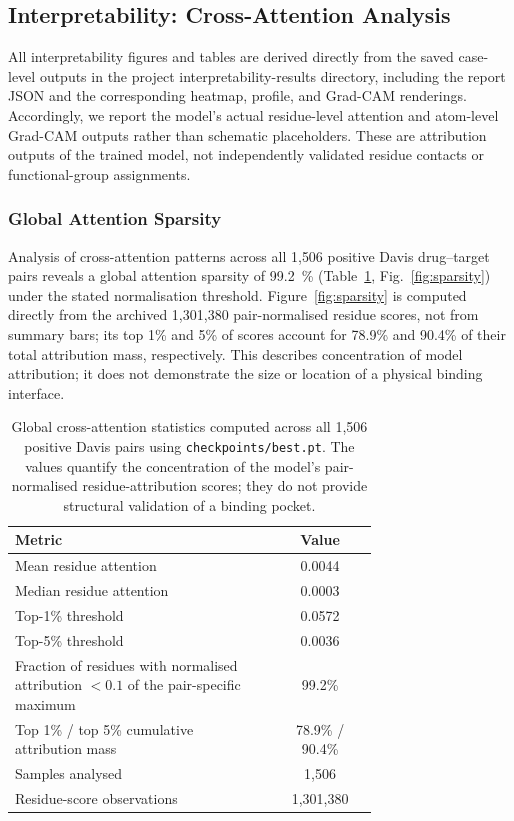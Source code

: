 \documentclass[fleqn,10pt]{wlscirep}
\begin{document}
\FloatBarrier

\subsection{Interpretability: Cross-Attention Analysis}
\label{sec:interpretability}

All interpretability figures and tables are derived directly from the saved
case-level outputs in the project interpretability-results directory, including
the report JSON and the corresponding heatmap, profile, and Grad-CAM renderings.
Accordingly, we report the model's actual residue-level attention and atom-level
Grad-CAM outputs rather than schematic placeholders.  These are attribution
outputs of the trained model, not independently validated residue contacts or
functional-group assignments.

\subsubsection{Global Attention Sparsity}

Analysis of cross-attention patterns across all 1{,}506 positive Davis
drug--target pairs
reveals a global attention sparsity of \SI{99.2}{\percent}
(Table~\ref{tab:global_attn}, Fig.~\ref{fig:sparsity}) under the stated
normalisation threshold. Figure~\ref{fig:sparsity} is computed directly from
the archived 1{,}301{,}380 pair-normalised residue scores, not from summary
bars; its top 1\% and 5\% of scores account for 78.9\% and 90.4\% of their
total attribution mass, respectively. This describes concentration of model
attribution; it does not demonstrate the size or location of a physical binding
interface.

\begin{table}[htbp]
\centering
\caption{Global cross-attention statistics computed across all 1{,}506 positive
  Davis pairs using \texttt{checkpoints/best.pt}. The values quantify the
  concentration of the model's pair-normalised
  residue-attribution scores; they do not provide structural validation of a
  binding pocket.}
\label{tab:global_attn}
\begin{tabular}{p{0.72\linewidth}c}
\toprule
\textbf{Metric} & \textbf{Value} \\
\midrule
Mean residue attention      & 0.0044 \\
Median residue attention    & 0.0003 \\
Top-1\% threshold           & 0.0572 \\
Top-5\% threshold           & 0.0036 \\
Fraction of residues with normalised attribution $<0.1$ of the pair-specific maximum & 99.2\% \\
Top 1\% / top 5\% cumulative attribution mass & 78.9\% / 90.4\% \\
Samples analysed            & 1{,}506 \\
Residue-score observations   & 1{,}301{,}380 \\
\bottomrule
\end{tabular}
\end{table}
\end{document}
